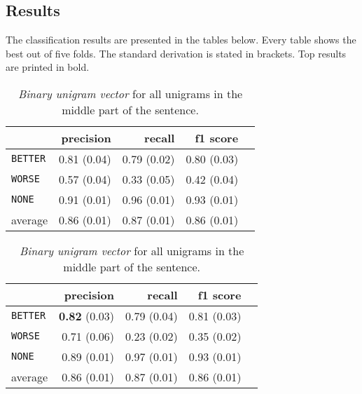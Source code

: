 \subsection{Results}
The classification results are presented in the tables below. Every table shows the best out of five folds. The standard derivation is stated in brackets. Top results are printed in bold.


\begin{table}[!htb]
    \begin{minipage}{.5\linewidth}
        \caption{\emph{Sentence embeddings on the middle part of the sentence}. (Standard derivation)} 
        \begin{tabular}{@{}lrrrr@{}}
\toprule
 	&	 precision &	 recall &	 f1 score  \\ \midrule 
\texttt{BETTER}	&	 0.81 \scriptsize{(0.04)} &	 0.79 \scriptsize{(0.02)} &	 0.80 \scriptsize{(0.03)}  \\ 
\texttt{WORSE}	&	 0.57 \scriptsize{(0.04)} &	 0.33 \scriptsize{(0.05)} &	 0.42 \scriptsize{(0.04)}  \\ 
\texttt{NONE}	&	 0.91 \scriptsize{(0.01)} &	 0.96 \scriptsize{(0.01)} &	 0.93 \scriptsize{(0.01)}  \\ 
average	&	 0.86 \scriptsize{(0.01)} &	 0.87 \scriptsize{(0.01)} &	 0.86 \scriptsize{(0.01)}  \\ 
\bottomrule
        \end{tabular} 
  \end{minipage} \hfill
    \begin{minipage}{.5\linewidth}
    \caption{ \emph{Binary unigram vector} for all unigrams in the middle part of the sentence. } 
          \begin{tabular}{@{}lrrrr@{}}
\toprule
 	&	 precision &	 recall &	 f1 score  \\ \midrule 
\texttt{BETTER}	&	 \textbf{0.82} \scriptsize{(0.03)} &	 0.79 \scriptsize{(0.04)} &	 0.81 \scriptsize{(0.03)}  \\ 
\texttt{WORSE}	&	 0.71 \scriptsize{(0.06)} &	 0.23 \scriptsize{(0.02)} &	 0.35 \scriptsize{(0.02)}  \\ 
\texttt{NONE}	&	 0.89 \scriptsize{(0.01)} &	 0.97 \scriptsize{(0.01)} &	 0.93 \scriptsize{(0.01)}  \\ 
average	&	 0.86 \scriptsize{(0.01)} &	 0.87 \scriptsize{(0.01)} &	 0.86 \scriptsize{(0.01)}  \\ 
\bottomrule
            \end{tabular}
    \end{minipage} 
\end{table}





